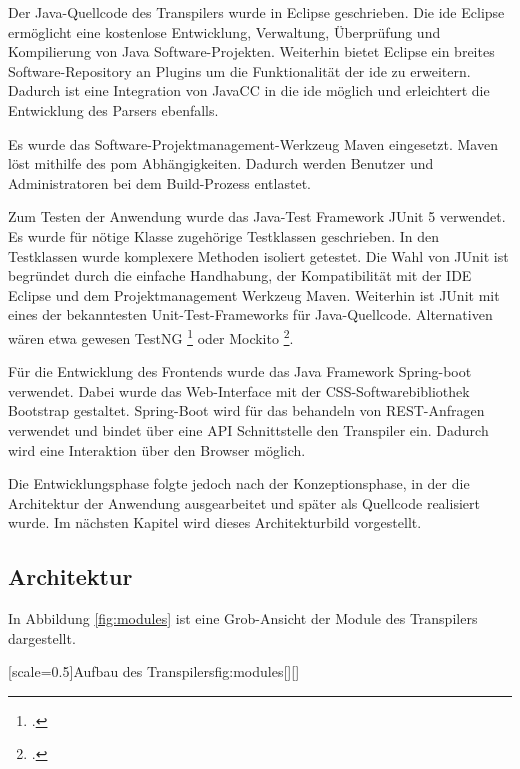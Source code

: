 Der Java-Quellcode des Transpilers wurde in Eclipse geschrieben. Die \ac{ide} Eclipse ermöglicht eine kostenlose Entwicklung, Verwaltung, Überprüfung und Kompilierung von Java Software-Projekten. Weiterhin bietet Eclipse ein breites Software-Repository an Plugins um die Funktionalität der  \ac{ide} zu erweitern. Dadurch ist eine Integration von JavaCC in die  \ac{ide} möglich und erleichtert die Entwicklung des Parsers ebenfalls.

Es wurde das Software-Projektmanagement-Werkzeug Maven eingesetzt. Maven löst mithilfe des \ac{pom} Abhängigkeiten. 
Dadurch werden Benutzer und Administratoren bei dem Build-Prozess entlastet.

Zum Testen der Anwendung wurde das Java-Test Framework JUnit 5 verwendet. Es wurde für nötige Klasse zugehörige Testklassen geschrieben. In den Testklassen wurde komplexere Methoden isoliert getestet.
Die Wahl von JUnit ist begründet durch die einfache Handhabung, der Kompatibilität mit der IDE Eclipse und dem Projektmanagement Werkzeug Maven. Weiterhin ist JUnit mit eines der bekanntesten Unit-Test-Frameworks für Java-Quellcode. Alternativen wären etwa gewesen TestNG \footcite[Vgl. ][]{testng} oder Mockito \footcite[Vgl. ][]{mockito}.

Für die Entwicklung des Frontends wurde das Java Framework Spring-boot verwendet.
Dabei wurde das Web-Interface mit der CSS-Softwarebibliothek Bootstrap gestaltet.
Spring-Boot wird für das behandeln von REST-Anfragen verwendet und bindet über eine API Schnittstelle den Transpiler ein.
Dadurch wird eine Interaktion über den Browser möglich.

Die Entwicklungsphase folgte jedoch nach der Konzeptionsphase, in der die Architektur der Anwendung ausgearbeitet und später als Quellcode realisiert wurde. 
Im nächsten Kapitel wird dieses Architekturbild vorgestellt.

\pagebreak
\subsection{Architektur} 

In Abbildung \ref{fig:modules} ist eine Grob-Ansicht der Module des Transpilers dargestellt.

[scale=0.5]{Aufbau des Transpilers}{fig:modules}[][]

